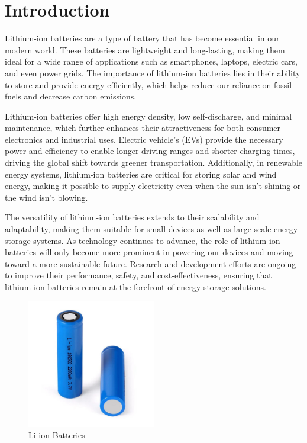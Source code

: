 \tableofcontents
\newpage
\listoffigures
\newpage

\chapter{Introduction}

Lithium-ion batteries are a type of battery that has become essential in our modern world. These batteries are lightweight and long-lasting, making them ideal for a wide range of applications such as smartphones, laptops, electric cars, and even power grids. The importance of lithium-ion batteries lies in their ability to store and provide energy efficiently, which helps reduce our reliance on fossil fuels and decrease carbon emissions.

Lithium-ion batteries offer high energy density, low self-discharge, and minimal maintenance, which further enhances their attractiveness for both consumer electronics and industrial uses. Electric vehicle's (EVs) provide the necessary power and efficiency to enable longer driving ranges and shorter charging times, driving the global shift towards greener transportation. Additionally, in renewable energy systems, lithium-ion batteries are critical for storing solar and wind energy, making it possible to supply electricity even when the sun isn't shining or the wind isn't blowing.

The versatility of lithium-ion batteries extends to their scalability and adaptability, making them suitable for small devices as well as large-scale energy storage systems. As technology continues to advance, the role of lithium-ion batteries will only become more prominent in powering our devices and moving toward a more sustainable future. Research and development efforts are ongoing to improve their performance, safety, and cost-effectiveness, ensuring that lithium-ion batteries remain at the forefront of energy storage solutions.

\begin{figure}[h!]
    \centering
    \includegraphics[width=0.5\textwidth]{importance_image.jpg} %
    \caption{Li-ion Batteries }
    \label{fig:importance}
\end{figure}


